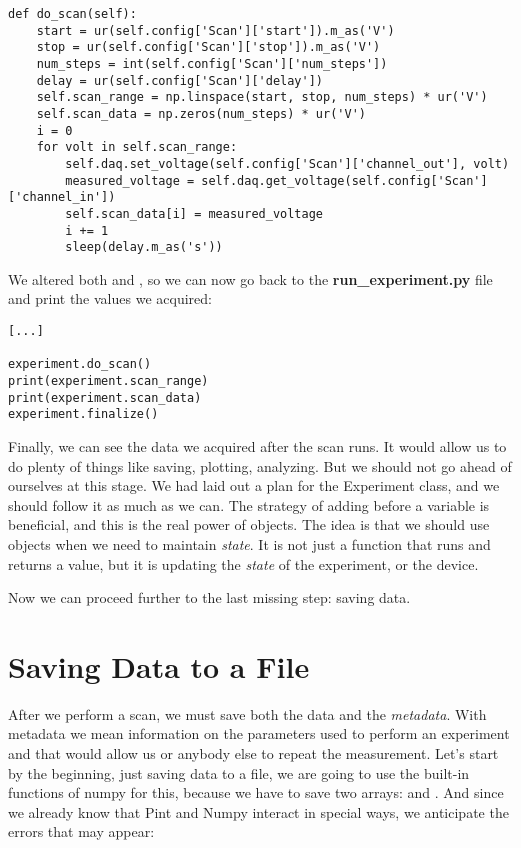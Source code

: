 \begin{verbatim}
def do_scan(self):
    start = ur(self.config['Scan']['start']).m_as('V')
    stop = ur(self.config['Scan']['stop']).m_as('V')
    num_steps = int(self.config['Scan']['num_steps'])
    delay = ur(self.config['Scan']['delay'])
    self.scan_range = np.linspace(start, stop, num_steps) * ur('V')
    self.scan_data = np.zeros(num_steps) * ur('V')
    i = 0
    for volt in self.scan_range:
        self.daq.set_voltage(self.config['Scan']['channel_out'], volt)
        measured_voltage = self.daq.get_voltage(self.config['Scan']['channel_in'])
        self.scan_data[i] = measured_voltage
        i += 1
        sleep(delay.m_as('s'))
\end{verbatim}

We altered both  and , so we can now go back to the \textbf{run\_experiment.py} file and print the values we acquired:

\begin{verbatim}
[...]

experiment.do_scan()
print(experiment.scan_range)
print(experiment.scan_data)
experiment.finalize()
\end{verbatim}

Finally, we can see the data we acquired after the scan runs. It would allow us to do plenty of things like saving, plotting, analyzing. But we should not go ahead of ourselves at this stage. We had laid out a plan for the Experiment class, and we should follow it as much as we can. The strategy of adding  before a variable is beneficial, and this is the real power of objects. The idea is that we should use objects when we need to maintain \emph{state}. It is not just a function that runs and returns a value, but it is updating the \emph{state} of the experiment, or the device.

Now we can proceed further to the last missing step: saving data.

\section{Saving Data to a File}\label{sec:saving-data}
After we perform a scan, we must save both the data and the \emph{metadata}. With metadata we mean information on the parameters used to perform an experiment and that would allow us or anybody else to repeat the measurement. Let's start by the beginning, just saving data to a file, we are going to use the built-in functions of numpy for this, because we have to save two arrays:  and . And since we already know that Pint and Numpy interact in special ways, we anticipate the errors that may appear:

